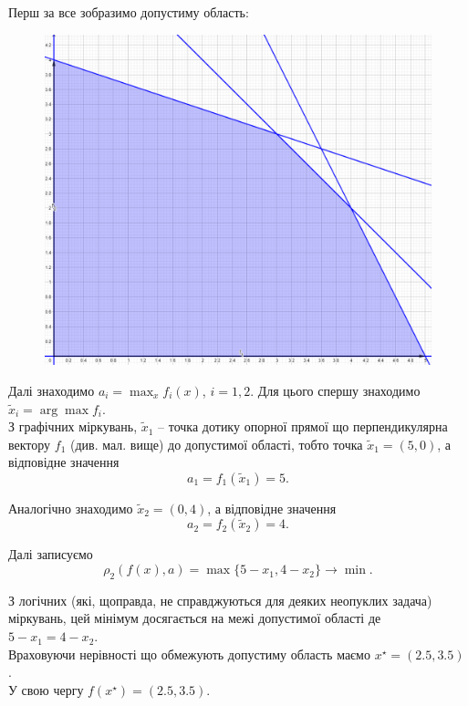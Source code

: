 \begin{solution}
    Перш за все зобразимо допустиму область:
    \begin{figure}[H]
        \centering
        \includegraphics[width=\textwidth]{ideal_point_3.png}
    \end{figure}
    
    Далі знаходимо $a_i = \max_x f_i(x)$, $i = 1, 2$. Для цього спершу знаходимо $\tilde x_i = \arg \max f_i$. \\
    
    З графічних міркувань, $\tilde x_1$ -- точка дотику опорної прямої що перпендикулярна вектору $f_1$ (див. мал. вище) до допустимої області, тобто точка $\tilde x_1 = \left( 5, 0 \right)$, а відповідне значення \[ a_1 = f_1(\tilde x_1) = 5. \]
    
    Аналогічно знаходимо $\tilde x_2 = \left( 0, 4 \right)$, а відповідне значення \[ a_2 = f_2(\tilde x_2) = 4. \]
    
    Далі записуємо \[ \rho_2(f(x), a) = \max\{ 5 - x_1, 4 - x_2\} \to \min. \]
    
    З логічних (які, щоправда, не справджуються для деяких неопуклих задача) міркувань, цей мінімум досягається на межі допустимої області де $5 - x_1 = 4 - x_2$. \\
    
    Враховуючи нерівності що обмежують допустиму область маємо $x^\star = \left( 2.5, 3.5 \right)$. \\
    
    У свою чергу $f(x^\star) = \left( 2.5, 3.5 \right)$.
\end{solution}

